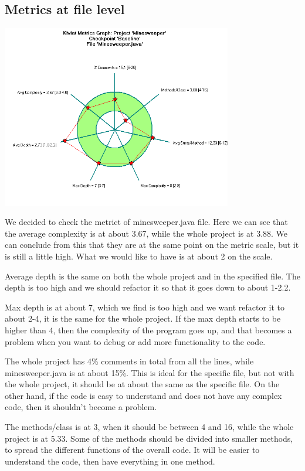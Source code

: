 \documentclass[UKenglish]{article}  %
\begin{document}
\subsection{Metrics at file level}
\includegraphics[height=8cm]{kiviat_diagram_minesweeper}

We decided to check the metrict of minesweeper.java file. Here we can see that the average complexity is at about 3.67, while the whole project is at 3.88. We can conclude from this that they are at the same point on the metric scale, but it is still a little high. What we would like to have is at about 2 on the scale. 

Average depth is the same on both the whole project and in the specified file. The depth is too high and we should refactor it so that it goes down to about 1-2.2. 

Max depth is at about 7, which we find is too high and we want refactor it to about 2-4, it is the same for the whole project. If the max depth starts to be higher than 4, then the complexity of the program goes up, and that becomes a problem when you want to debug or add more functionality to the code. 

The whole project has 4\% comments in total from all the lines, while minesweeper.java is at about 15\%. This is ideal for the specific file, but not with the whole project, it should be at about the same as the specific file. On the other hand, if the code is easy to understand and does not have any complex code, then it shouldn't become a problem. 

The methods/class is at 3, when it should be between 4 and 16, while the whole project is at 5.33. Some of the methods should be divided into smaller methods, to spread the different functions of the overall code. It will be easier to understand the code, then have everything in one method.
\end{document}
